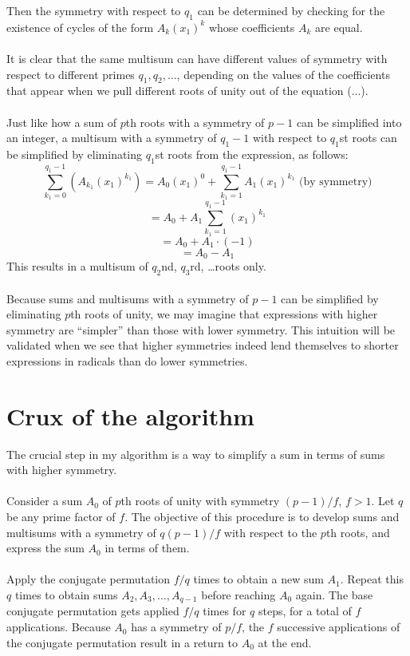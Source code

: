 \documentclass{article}
\begin{document}
    Then the symmetry with respect to $ q_1 $ can be determined by checking for the existence of cycles of the form $ A_k (x_1)^k $ whose coefficients $ A_k $ are equal.\\
    \\
    It is clear that the same multisum can have different values of symmetry with respect to different primes $ q_1, q_2, \dots $, depending on the values of the coefficients that appear when we pull different roots of unity out of the equation (...).\\
    \\
    Just like how a sum of $ p $th roots with a symmetry of $ p - 1 $ can be simplified into an integer, a multisum with a symmetry of $ q_1 - 1 $ with respect to $ q_1 $st roots can be simplified by eliminating $ q_1 $st roots from the expression, as follows:
    $$ \sum_{k_1 = 0}^{q_1 - 1} (A_{k_1} (x_1)^{k_1}) = A_0 (x_1)^0 + \sum_{k_1 = 1}^{q_1 - 1} A_1 (x_1)^{k_1} \text{ (by symmetry)} $$
    $$ = A_0 + A_1 \sum_{k_1 = 1}^{q_1 - 1} (x_1)^{k_1} $$
    $$ = A_0 + A_1 \cdot (-1) $$
    $$ = A_0 - A_1 $$
    This results in a multisum of $ q_2 $nd, $ q_3 $rd, \dots roots only.\\
    \\
    Because sums and multisums with a symmetry of $ p - 1 $ can be simplified by eliminating $ p $th roots of unity, we may imagine that expressions with higher symmetry are ``simpler'' than those with lower symmetry. This intuition will be validated when we see that higher symmetries indeed lend themselves to shorter expressions in radicals than do lower symmetries.\\
\section{Crux of the algorithm}
    The crucial step in my algorithm is a way to simplify a sum in terms of sums with higher symmetry.\\
    \\
    Consider a sum $ A_0 $ of $ p $th roots of unity with symmetry $ (p - 1)/f $, $ f > 1 $. Let $ q $ be any prime factor of $ f $. The objective of this procedure is to develop sums and multisums with a symmetry of $ q(p - 1)/f $ with respect to the $ p $th roots, and express the sum $ A_0 $ in terms of them.\\
    \\
    Apply the conjugate permutation $ f/q $ times to obtain a new sum $ A_1 $. Repeat this $ q $ times to obtain sums $ A_2, A_3, \dots, A_{q - 1} $ before reaching $ A_0 $ again. The base conjugate permutation gets applied $ f/q $ times for $ q $ steps, for a total of $ f $ applications. Because $ A_0 $ has a symmetry of $ p/f $, the $ f $ successive applications of the conjugate permutation result in a return to $ A_0 $ at the end.\\
\end{document}
